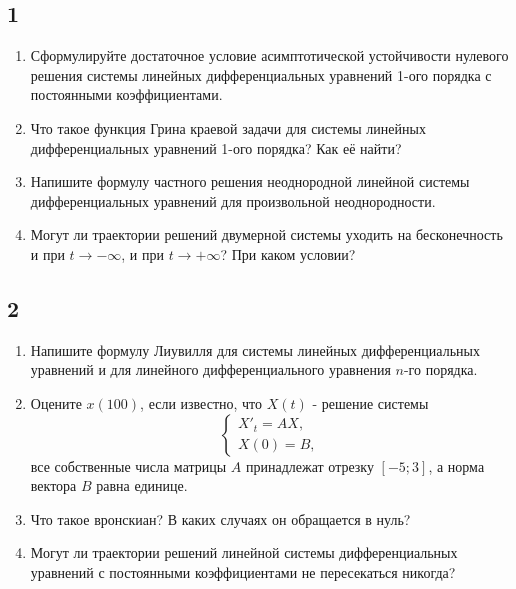 \documentclass[10pt, a4paper]{article}
\begin{document}
    \subsection*{1}
    \begin{enumerate}
        \item Сформулируйте достаточное условие асимптотической устойчивости
            нулевого решения системы линейных дифференциальных уравнений
            1-ого порядка с постоянными коэффициентами.
        
        \item Что такое функция Грина краевой задачи для системы линейных 
            дифференциальных уравнений 1-ого порядка? Как её найти?
        \item Напишите формулу частного решения неоднородной линейной системы 
            дифференциальных уравнений для произвольной неоднородности.
        \item Могут ли траектории решений двумерной системы уходить на 
            бесконечность и при $t\to -\infty$, и при $t\to +\infty$? 
            При каком условии?
    \end{enumerate}

    \subsection*{2}
    \begin{enumerate}
        \item Напишите формулу Лиувилля для системы линейных дифференциальных 
            уравнений и для линейного дифференциального уравнения 
            $n$-го порядка.
        \item Оцените $x(100)$, если известно, что $X(t)$ - решение системы
            $$\begin{cases}
                X'_t= AX,\\
                X(0) = B,
            \end{cases}$$
            все собственные числа матрицы $A$ принадлежат отрезку $[-5;3]$, а норма
            вектора $B$ равна единице.
        \item Что такое вронскиан? В каких случаях он обращается в нуль?
        \item Могут ли траектории решений линейной системы дифференциальных уравнений 
        с постоянными коэффициентами не пересекаться никогда?  
    \end{enumerate}
\end{document}
